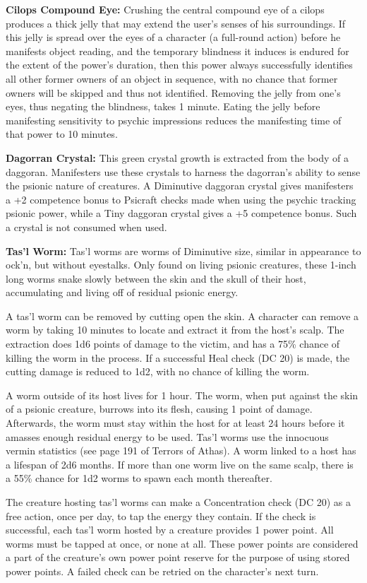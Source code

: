 \textbf{Cilops Compound Eye:} Crushing the central compound eye of a cilops produces a thick jelly that may extend the user's senses of his surroundings. If this jelly is spread over the eyes of a character (a full-round action) before he manifests object reading, and the temporary blindness it induces is endured for the extent of the power's duration, then this power always successfully identifies all other former owners of an object in sequence, with no chance that former owners will be skipped and thus not identified. Removing the jelly from one's eyes, thus negating the blindness, takes 1 minute. Eating the jelly before manifesting sensitivity to psychic impressions reduces the manifesting time of that power to 10 minutes.

\textbf{Dagorran Crystal:} This green crystal growth is extracted from the body of a daggoran. Manifesters use these crystals to harness the dagorran's ability to sense the psionic nature of creatures. A Diminutive daggoran crystal gives manifesters a +2 competence bonus to Psicraft checks made when using the psychic tracking psionic power, while a Tiny daggoran crystal gives a +5 competence bonus. Such a crystal is not consumed when used.

\textbf{Tas'l Worm:} Tas'l worms are worms of Diminutive size, similar in appearance to ock'n, but without eyestalks. Only found on living psionic creatures, these 1-inch long worms snake slowly between the skin and the skull of their host, accumulating and living off of residual psionic energy.

A tas'l worm can be removed by cutting open the skin. A character can remove a worm by taking 10 minutes to locate and extract it from the host's scalp. The extraction does 1d6 points of damage to the victim, and has a 75\% chance of killing the worm in the process. If a successful Heal check (DC 20) is made, the cutting damage is reduced to 1d2, with no chance of killing the worm.

A worm outside of its host lives for 1 hour. The worm, when put against the skin of a psionic creature, burrows into its flesh, causing 1 point of damage. Afterwards, the worm must stay within the host for at least 24 hours before it amasses enough residual energy to be used. Tas'l worms use the innocuous vermin statistics (see page 191 of Terrors of Athas). A worm linked to a host has a lifespan of 2d6 months. If more than one worm live on the same scalp, there is a 55\% chance for 1d2 worms to spawn each month thereafter.

The creature hosting tas'l worms can make a Concentration check (DC 20) as a free action, once per day, to tap the energy they contain. If the check is successful, each tas'l worm hosted by a creature provides 1 power point. All worms must be tapped at once, or none at all. These power points are considered a part of the creature's own power point reserve for the purpose of using stored power points. A failed check can be retried on the character's next turn.

